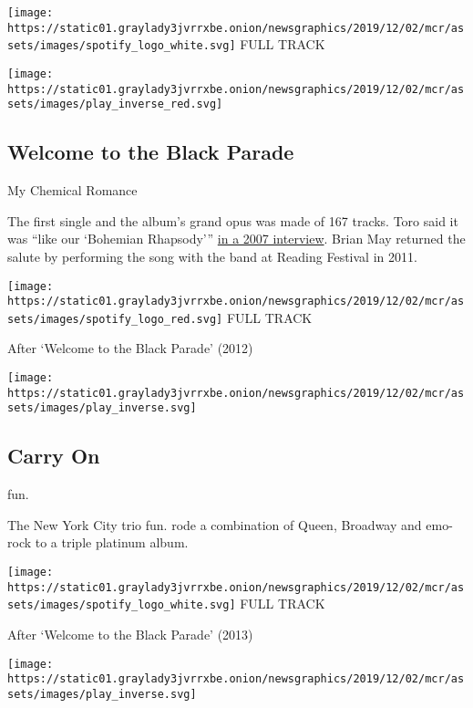 \texttt{[image: https://static01.graylady3jvrrxbe.onion/newsgraphics/2019/12/02/mcr/assets/images/spotify\_logo\_white.svg]}
FULL TRACK

\texttt{[image: https://static01.graylady3jvrrxbe.onion/newsgraphics/2019/12/02/mcr/assets/images/play\_inverse\_red.svg]}

\hypertarget{welcome-to-the-black-parade-1}{%
\subsection{Welcome to the Black
Parade}\label{welcome-to-the-black-parade-1}}

My Chemical Romance

The first single and the album's grand opus was made of 167 tracks. Toro
said it was ``like our `Bohemian Rhapsody'''
\href{https://www.seymourduncan.com/blog/backstage-pass/ray-toro-of-my-chemical-romance}{in
a 2007 interview}. Brian May returned the salute by performing the song
with the band at Reading Festival in 2011.

\href{https://open.spotify.com/track/5wQnmLuC1W7ATsArWACrgW?si=mt4m-XgxS1Wg0nEntXFhQw}{}

\texttt{[image: https://static01.graylady3jvrrxbe.onion/newsgraphics/2019/12/02/mcr/assets/images/spotify\_logo\_red.svg]}
FULL TRACK

After `Welcome to the Black Parade' (2012)

\texttt{[image: https://static01.graylady3jvrrxbe.onion/newsgraphics/2019/12/02/mcr/assets/images/play\_inverse.svg]}

\hypertarget{carry-on}{%
\subsection{Carry On}\label{carry-on}}

fun.

The New York City trio fun. rode a combination of Queen, Broadway and
emo-rock to a triple platinum album.

\href{https://open.spotify.com/track/7gpy7sfWPNuOKmUNs3XQYE?si=iiol5pBOQT6YsqO3QJpz6A}{}

\texttt{[image: https://static01.graylady3jvrrxbe.onion/newsgraphics/2019/12/02/mcr/assets/images/spotify\_logo\_white.svg]}
FULL TRACK

After `Welcome to the Black Parade' (2013)

\texttt{[image: https://static01.graylady3jvrrxbe.onion/newsgraphics/2019/12/02/mcr/assets/images/play\_inverse.svg]}

